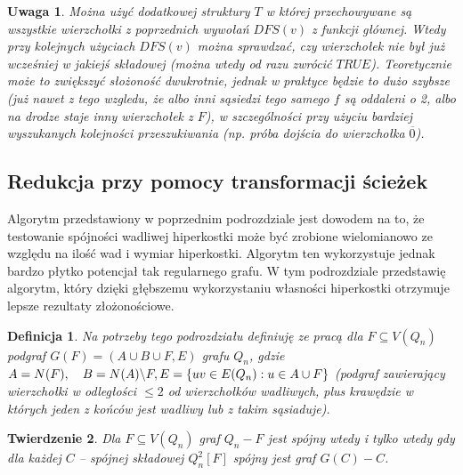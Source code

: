 \documentclass{pracamgr}
\newtheorem{defi}{Definicja}[section] %
\newtheorem{theorem}{Twierdzenie}
\newtheorem{remark}[theorem]{Uwaga}
\begin{document}
     \begin{remark}\label{dwie struktury T}
      Można użyć dodatkowej struktury $T$ w której przechowywane są wszystkie wierzchołki z poprzednich wywołań $DFS(v)$ z funkcji głównej.
      Wtedy przy kolejnych użyciach $DFS(v)$ można sprawdzać, czy wierzchołek nie był już wcześniej w jakiejś składowej (można wtedy od razu zwrócić $TRUE$).
      Teoretycznie może to zwiększyć słożoność dwukrotnie, jednak w praktyce będzie to dużo szybsze
      (już nawet z tego wzgledu, że albo inni sąsiedzi tego samego $f$ są oddaleni o 2, albo na drodze staje inny wierzchołek z $F$),
      w szczególności przy użyciu bardziej wyszukanych kolejności przeszukiwania (np. próba dojścia do wierzchołka $\overline{0}$).
     \end{remark}

     
   \subsection{Redukcja przy pomocy transformacji ścieżek}
    Algorytm przedstawiony w poprzednim podrozdziale jest dowodem na to, że testowanie spójności wadliwej hiperkostki może być zrobione wielomianowo
    ze względu na ilość wad i wymiar hiperkostki. Algorytm ten wykorzystuje jednak bardzo płytko potencjał tak regularnego grafu.
    W tym podrozdziale przedstawię algorytm, który dzięki głębszemu wykorzystaniu własności hiperkostki otrzymuje lepsze rezultaty złożonościowe.
    \begin{defi}\label{podgrafy kostki}
     Na potrzeby tego podrozdziału definiuję ze pracą \cite{DFGKR} dla $F\subseteq V(Q_n)$\newline
     podgraf $G(F)=(A\cup B\cup F,E)$ grafu $Q_n$,
     gdzie $A=N(F),\quad B=N(A)\backslash F,\newline E=\{uv\in E(Q_n):u\in A\cup F\}$ (podgraf zawierający wierzchołki w odległości $\le 2$ od wierzchołków wadliwych,
     plus krawędzie w których jeden z końców jest wadliwy lub z takim sąsiaduje).
    \end{defi}
    \begin{theorem}\label{spojnosc z lokalnej spojnosci}
     Dla $F\subseteq V(Q_n)$ graf $Q_n-F$ jest spójny wtedy i tylko wtedy gdy dla każdej $C$ -- spójnej składowej $Q_n^2[F]$ spójny jest graf $G(C)-C$.
    \end{theorem}
\end{document}

